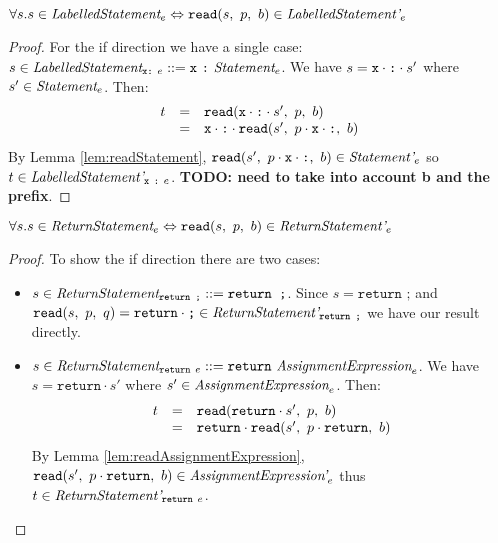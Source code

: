 \documentclass[preprint,10pt]{sigplanconf}
\begin{document}
\begin{lemma}\mbox{}
  
  \( \forall s. s \in \textit{LabelledStatement}_{e} \Leftrightarrow 
  \texttt{read}(s,~p,~b) \in \textit{LabelledStatement'}_{e} \)
\end{lemma}
\begin{proof}
  For the if direction we have a single case: \( s \in
  \textit{LabelledStatement}_{\texttt{x} \texttt{:}~e} ::=
  \texttt{x}~\texttt{:}~\textit{Statement}_{e} \). We have \( s = \texttt{x} \cdot
  \texttt{:} \cdot s' \) where \( s' \in \textit{Statement}_{e} \).
  Then:
  \[
  \begin{array}{rcl}
    t &=& \texttt{read}(\texttt{x} \cdot \texttt{:} \cdot s',~p,~b)
    \\
    &=& \texttt{x} \cdot \texttt{:} \cdot 
    \texttt{read}(s',~
      p \cdot \texttt{x} \cdot \texttt{:}
    ,~b)
  \end{array}
  \]
  By Lemma \ref{lem:readStatement}, \( \texttt{read}(s',~p \cdot \texttt{x} \cdot
    \texttt{:},~b) \in \textit{Statement'}_{e} \) so \( t \in
  \textit{LabelledStatement'}_{\texttt{x}~\texttt{:}~e} \).
  \textbf{TODO: need to take into account b and the prefix}.
\end{proof}

\begin{lemma}\mbox{}
  
  \( \forall s. s \in \textit{ReturnStatement}_{e} \Leftrightarrow 
  \texttt{read}(s,~p,~b) \in \textit{ReturnStatement'}_{e} \)
\end{lemma}
\begin{proof}
  To show the if direction there are two cases:
  \begin{itemize}
  \item \( s \in \textit{ReturnStatement}_{\texttt{return ;}} ::=
    \texttt{return ;} \). Since \( s = \texttt{return ;} \) and \(
    \texttt{read}(s,~p,~q) = \texttt{return}\cdot\texttt{;} \in
    \textit{ReturnStatement'}_{\texttt{return ;}} \) we have our result
    directly.

  \item \( s \in \textit{ReturnStatement}_{\texttt{return}~e} ::=
    \texttt{return}~ \textit{AssignmentExpression}_{e} \). We have \( s
    = \texttt{return}\cdot s' \) where \( s' \in
    \textit{AssignmentExpression}_{e} \). Then:
    \[
    \begin{array}{rcl}
      t &=& \texttt{read}(\texttt{return} \cdot s',~p,~b)
      \\
      &=& \texttt{return}\cdot \texttt{read}(s',~p \cdot \texttt{return},~b)
    \end{array}
    \]
    By Lemma \ref{lem:readAssignmentExpression}, \( \texttt{read}(s',~p
      \cdot \texttt{return},~b) \in \textit{AssignmentExpression'}_{e}
    \) thus \( t \in \textit{ReturnStatement'}_{\texttt{return}~e} \).
  \end{itemize}
\end{proof}
\end{document}
